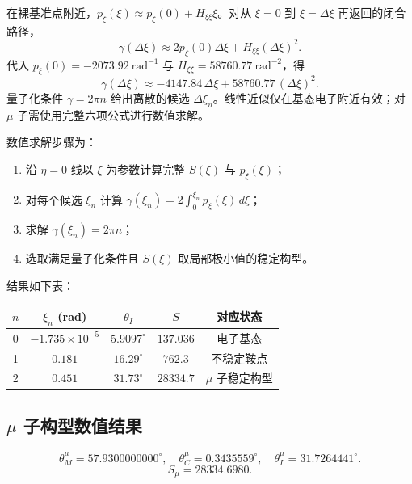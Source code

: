 \documentclass[12pt,a4paper]{article}
\theoremstyle{definition}
\begin{document}
在裸基准点附近，$p_\xi(\xi)\approx p_\xi(0)+H_{\xi\xi}\xi$。对从 $\xi=0$ 到 $\xi=\Delta\xi$ 再返回的闭合路径，
\begin{equation}
\gamma(\Delta\xi)\approx 2p_\xi(0)\Delta\xi+H_{\xi\xi}(\Delta\xi)^2.
\end{equation}
代入 $p_\xi(0)=-2073.92~\mathrm{rad}^{-1}$ 与 $H_{\xi\xi}=58760.77~\mathrm{rad}^{-2}$，得
\begin{equation}
\gamma(\Delta\xi)\approx -4147.84\,\Delta\xi+58760.77\,(\Delta\xi)^2.
\end{equation}
量子化条件 $\gamma=2\pi n$ 给出离散的候选 $\Delta\xi_n$。线性近似仅在基态电子附近有效；对 $\mu$ 子需使用完整六项公式进行数值求解。

数值求解步骤为：
\begin{enumerate}
\item 沿 $\eta=0$ 线以 $\xi$ 为参数计算完整 $S(\xi)$ 与 $p_\xi(\xi)$；
\item 对每个候选 $\xi_n$ 计算 $\gamma(\xi_n)=2\int_0^{\xi_n}p_\xi(\xi)\,d\xi$；
\item 求解 $\gamma(\xi_n)=2\pi n$；
\item 选取满足量子化条件且 $S(\xi)$ 取局部极小值的稳定构型。
\end{enumerate}

结果如下表：

\begin{center}
\begin{tabular}{@{}ccccc@{}}
\toprule
$n$ & $\xi_n$ (rad) & $\theta_I$ & $S$ & 对应状态 \\
\midrule
0 & $-1.735\times10^{-5}$ & $5.9097^\circ$ & $137.036$ & 电子基态 \\
1 & $0.181$ & $16.29^\circ$ & $762.3$ & 不稳定鞍点 \\
2 & $0.451$ & $31.73^\circ$ & $28334.7$ & $\mu$ 子稳定构型 \\
\bottomrule
\end{tabular}
\end{center}

\subsection{$\mu$ 子构型数值结果}

\begin{equation}
\boxed{\theta_M^\mu=57.9300000000^\circ,\quad \theta_C^\mu=0.3435559^\circ,\quad \theta_I^\mu=31.7264441^\circ.}
\end{equation}
\begin{equation}
\boxed{S_\mu=28334.6980.}
\end{equation}
\end{document}
